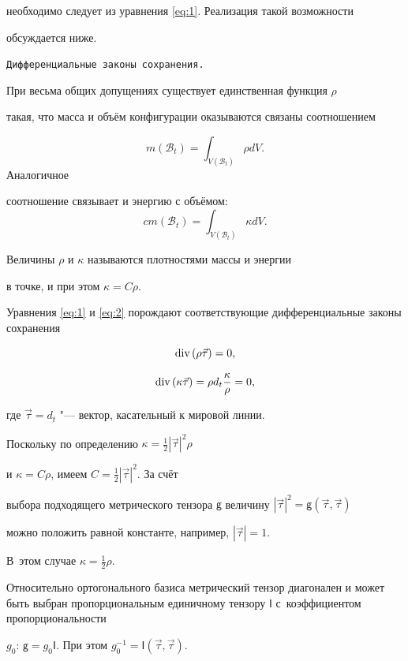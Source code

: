 необходимо следует из уравнения \eqref{eq:1}. Реализация такой возможности

обсуждается ниже.



\smallskip



{\tt Дифференциальные законы сохранения.}

При весьма общих допущениях существует единственная функция $\rho$

такая, что масса и объём конфигурации оказываются связаны соотношением

$$m(\mathcal{B}_{t})=\int_{V(\mathcal{B}_{t})}\rho dV.$$ Аналогичное

соотношение связывает и энергию с объёмом: $$cm(\mathcal{B}_{t})=\int_{V(\mathcal{B}_{t})}\kappa dV.$$

Величины $\rho$ и $\kappa$ называются плотностями массы и энергии

в точке, и при этом $\kappa=C\rho$. 



Уравнения \eqref{eq:1} и \eqref{eq:2} порождают соответствующие дифференциальные законы сохранения

\begin{equation}

\textnormal{div}\left(\rho\vec{\tau}\right) =  0,\label{eq:3}

\end{equation}

$$\textnormal{div}\left(\kappa\vec{\tau}\right)=\rho d_{t}\frac{\kappa}{\rho} = 0,$$

где $\vec{\tau}=d_{t}$ "---  вектор, касательный к мировой линии.

Поскольку по определению $\kappa=\frac{1}{2}|\vec{\tau}|^{2}\rho$

и $\kappa=C\rho$, имеем $C=\frac{1}{2}|\vec{\tau}|^{2}$. За счёт

выбора подходящего метрического тензора $\mathsf{g}$ величину $|\vec{\tau}|^{2}=\mathsf{g}(\vec{\tau},\vec{\tau})$

можно положить равной константе, например, $|\vec{\tau}|=1$. 

В~этом случае $\kappa=\frac{1}{2}\rho$. 

Относительно ортогонального базиса метрический тензор диагонален и может быть выбран пропорциональным единичному тензору $\mathsf{I}$ с~коэффициентом пропорциональности

$g_{0}$: $\mathsf{g}=g_{0}\mathsf{I}$. При этом $g_{0}^{-1}=\mathsf{I}(\vec{\tau},\vec{\tau})$.



